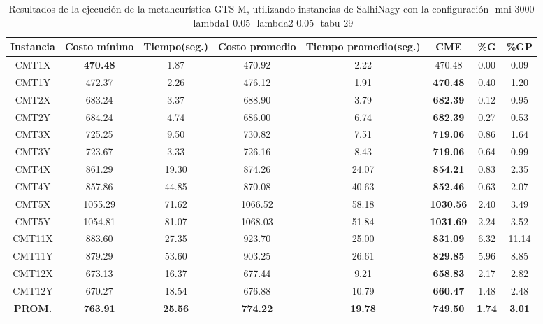\begin{table}[h]
\caption{Resultados de la ejecución de la metaheurística GTS-M, utilizando instancias de SalhiNagy con la configuración -mni 3000 -lambda1 0.05 -lambda2 0.05 -tabu 29}
\centering
\small
\begin{tabular}{c c c c c c c c}
\hline\hline
Instancia & Costo mínimo & Tiempo(seg.) & Costo promedio & Tiempo promedio(seg.) & CME & \%G & \%GP \\ [0.5ex]
\hline
CMT1X & \bf{470.48} & 1.87 & 
470.92 & 2.22 & 470.48 & 0.00
 & 0.09\\CMT1Y & 472.37 & 2.26 & 
476.12 & 1.91 & \bf{470.48} & 
0.40 & 1.20\\CMT2X & 683.24 & 3.37 & 
688.90 & 3.79 & \bf{682.39} & 
0.12 & 0.95\\CMT2Y & 684.24 & 4.74 & 
686.00 & 6.74 & \bf{682.39} & 
0.27 & 0.53\\CMT3X & 725.25 & 9.50 & 
730.82 & 7.51 & \bf{719.06} & 
0.86 & 1.64\\CMT3Y & 723.67 & 3.33 & 
726.16 & 8.43 & \bf{719.06} & 
0.64 & 0.99\\CMT4X & 861.29 & 19.30 & 
874.26 & 24.07 & \bf{854.21} & 
0.83 & 2.35\\CMT4Y & 857.86 & 44.85 & 
870.08 & 40.63 & \bf{852.46} & 
0.63 & 2.07\\CMT5X & 1055.29 & 71.62 & 
1066.52 & 58.18 & \bf{1030.56} & 
2.40 & 3.49\\CMT5Y & 1054.81 & 81.07 & 
1068.03 & 51.84 & \bf{1031.69} & 
2.24 & 3.52\\CMT11X & 883.60 & 27.35 & 
923.70 & 25.00 & \bf{831.09} & 
6.32 & 11.14\\CMT11Y & 879.29 & 53.60 & 
903.25 & 26.61 & \bf{829.85} & 
5.96 & 8.85\\CMT12X & 673.13 & 16.37 & 
677.44 & 9.21 & \bf{658.83} & 
2.17 & 2.82\\CMT12Y & 670.27 & 18.54 & 
676.88 & 10.79 & \bf{660.47} & 
1.48 & 2.48\\\bf{PROM.} & 
\bf{763.91} & \bf{25.56} & \bf{774.22} & \bf{19.78} & \bf{749.50} & \bf{1.74} & \bf{3.01}\\[1ex]\hline
\end{tabular}
\label{table:nonlin}
\end{table}
